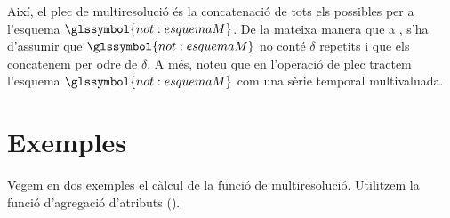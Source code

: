  
Així, el plec de multiresolució és la concatenació de tots els
 possibles per a l'esquema
$\glssymbol{not:esquemaM}$. De la mateixa manera que a
, s'ha d'assumir que
$\glssymbol{not:esquemaM}$ no conté $\delta$ repetits i que els
concatenem per odre de $\delta$. A més, noteu que en l'operació de
plec tractem l'esquema $\glssymbol{not:esquemaM}$ com una sèrie
temporal multivaluada.






\section{Exemples}

Vegem en dos exemples el càlcul de la funció de multiresolució.
Utilitzem la funció d'agregació d'atributs 
 ().


